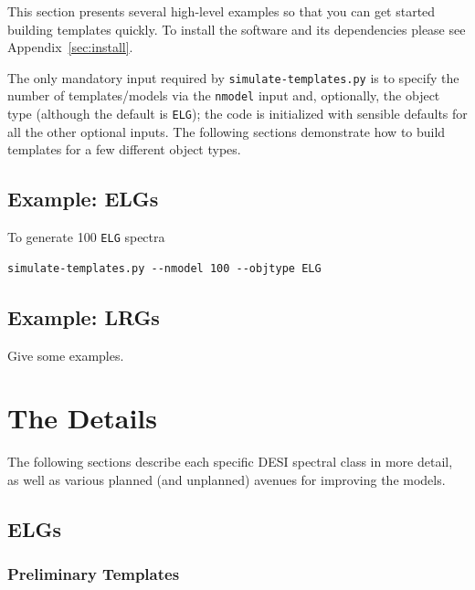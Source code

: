 \documentclass[12pt]{article}
\newcommand{\simt}{{\tt simulate-templates.py}}
\begin{document}
This section presents several high-level examples so that you can get started
building templates quickly.  To install the software and its dependencies please
see Appendix~\ref{sec:install}.

The only mandatory input required by \simt{} is to specify the number of
templates/models via the {\tt nmodel} input and, optionally, the object type
(although the default is {\tt ELG}); the code is initialized with sensible
defaults for all the other optional inputs.  The following sections demonstrate
how to build templates for a few different object types.

\subsection{Example: ELGs}

To generate 100 {\tt ELG} spectra 

\begin{verbatim}
simulate-templates.py --nmodel 100 --objtype ELG
\end{verbatim}

\subsection{Example: LRGs}

Give some examples.

\section{The Details}

The following sections describe each specific DESI spectral class in more
detail, as well as various planned (and unplanned) avenues for improving the
models.


\subsection{ELGs}

\subsubsection{Preliminary Templates}\label{elg:prelim}
\end{document}
